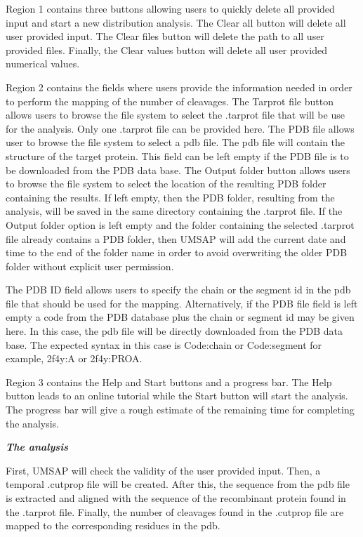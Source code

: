 Region \num{1} contains three buttons allowing users to quickly delete all provided input and start a new distribution analysis. The Clear all button will delete all user provided input. The Clear files button will delete the path to all user provided files. Finally, the Clear values button will delete all user provided numerical values.

Region \num{2} contains the fields where users provide the information needed in order to perform the mapping of the number of cleavages. The Tarprot file button allows users to browse the file system to select the .tarprot file that will be use for the analysis. Only one .tarprot file can be provided here. The PDB file allows user to browse the file system to select a pdb file. The pdb file will contain the structure of the target protein. This field can be left empty if the PDB file is to be downloaded from the PDB data base. The Output folder button allows users to browse the file system to select the location of the resulting PDB folder containing the results. If left empty, then the PDB folder, resulting from the analysis, will be saved in the same directory containing the .tarprot file. If the Output folder option is left empty and the folder containing the selected .tarprot file already contains a PDB folder, then UMSAP will add the current date and time to the end of the folder name in order to avoid overwriting the older PDB folder without explicit user permission.

The PDB ID field allows users to specify the chain or the segment id in the pdb file that should be used for the mapping. Alternatively, if the PDB file field is left empty a code from the PDB database plus the chain or segment id may be given here. In this case, the pdb file will be directly downloaded from the PDB data base. The expected syntax in this case is Code:chain or Code:segment for example, 2f4y:A or 2f4y:PROA.  

Region \num{3} contains the Help and Start buttons and a progress bar. The Help button leads to an online tutorial while the Start button will start the analysis. The progress bar will give a rough estimate of the remaining time for completing the analysis.

\textit{\textbf{The analysis}}

First, UMSAP will check the validity of the user provided input. Then, a temporal .cutprop file will be created. After this, the sequence from the pdb file is extracted and aligned with the sequence of the recombinant protein found in the .tarprot file. Finally, the number of cleavages found in the .cutprop file are mapped to the corresponding residues in the pdb.


